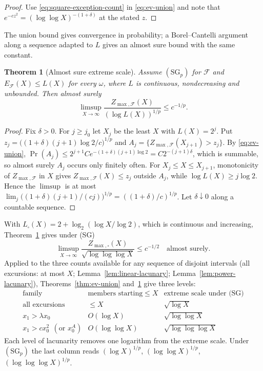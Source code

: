 \documentclass[11pt]{amsart}
\numberwithin{equation}{section}
\theoremstyle{plain}
\newtheorem{theorem}{Theorem}[section]
\theoremstyle{definition}
\theoremstyle{remark}
\newcommand{\F}{\mathcal{F}}
\begin{document}
\begin{proof}
Use \eqref{eq:square-exception-count} in \eqref{eq:ev-union} and note that
$e^{-cz^2}=(\log\log X)^{-(1+\delta)}$ at the stated $z$.
\end{proof}

The union bound gives convergence in probability; a Borel--Cantelli argument
along a sequence adapted to $L$ gives an almost sure bound with the same
constant.

\begin{theorem}[Almost sure extreme scale]
\label{thm:ev-as}
Assume $(\mathrm{SG}_p)$ for $\F$ and $E_\F(X)\le L(X)$ for every $\omega$,
where $L$ is continuous, nondecreasing and unbounded. Then almost surely
\[
\limsup_{X\to\infty}\frac{Z_{\max,\F}(X)}{(\log L(X))^{1/p}}\le c^{-1/p}.
\]
\end{theorem}

\begin{proof}
Fix $\delta>0$. For $j\ge j_0$ let $X_j$ be the least $X$ with $L(X)=2^j$.
Put $z_j=\bigl((1+\delta)(j+1)\log2/c\bigr)^{1/p}$ and
$A_j=\{Z_{\max,\F}(X_{j+1})>z_j\}$. By \eqref{eq:ev-union},
$\Pr(A_j)\le2^{j+1}Ce^{-(1+\delta)(j+1)\log2}=C2^{-(j+1)\delta}$, which is
summable, so almost surely $A_j$ occurs only finitely often. For
$X_j\le X\le X_{j+1}$, monotonicity of $Z_{\max,\F}$ in $X$ gives
$Z_{\max,\F}(X)\le z_j$ outside $A_j$, while $\log L(X)\ge j\log2$. Hence
the $\limsup$ is at most
$\lim_j\bigl((1+\delta)(j+1)/(cj)\bigr)^{1/p}=((1+\delta)/c)^{1/p}$. Let
$\delta\downarrow0$ along a countable sequence.
\end{proof}

With $L_\square(X)=2+\log_2(\log X/\log2)$, which is continuous and
increasing, Theorem~\ref{thm:ev-as} gives under (SG)
\[
\limsup_{X\to\infty}\frac{Z_{\max,\square}(X)}{\sqrt{\log\log\log X}}\le c^{-1/2}
\quad\text{almost surely.}
\]
Applied to the three counts available for any sequence of disjoint
intervals (all excursions: at most $X$; Lemma~\ref{lem:linear-lacunary};
Lemma~\ref{lem:power-lacunary}), Theorems~\ref{thm:ev-union}
and~\ref{thm:ev-as} give three levels:
\[
\begin{array}{c|c|c}
\text{family} & \text{members starting}\le X & \text{extreme scale under (SG)}\\
\hline
\text{all excursions} & \le X & \sqrt{\log X}\\
x_1>\lambda x_0 & O(\log X) & \sqrt{\log\log X}\\
x_1>cx_0^2\ \ (\text{or }x_0^A) & O(\log\log X) & \sqrt{\log\log\log X}
\end{array}
\]
Each level of lacunarity removes one logarithm from the extreme scale.
Under $(\mathrm{SG}_p)$ the last column reads $(\log X)^{1/p}$,
$(\log\log X)^{1/p}$, $(\log\log\log X)^{1/p}$.
\end{document}
